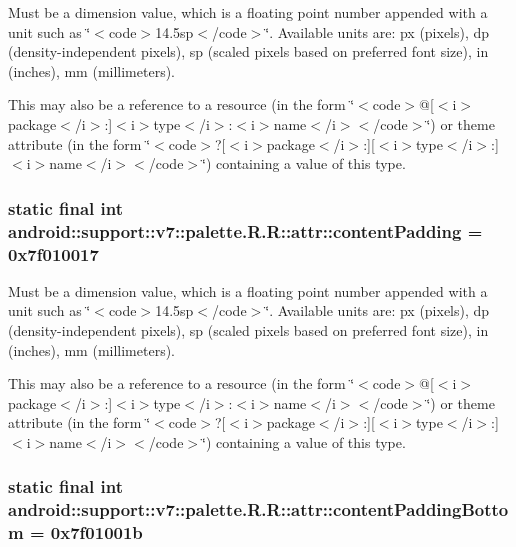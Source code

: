 Must be a dimension value, which is a floating point number appended with a unit such as \char`\"{}$<$code$>$14.5sp$<$/code$>$\char`\"{}. Available units are: px (pixels), dp (density-independent pixels), sp (scaled pixels based on preferred font size), in (inches), mm (millimeters). 

This may also be a reference to a resource (in the form \char`\"{}$<$code$>$@\mbox{[}$<$i$>$package$<$/i$>$:\mbox{]}$<$i$>$type$<$/i$>$:$<$i$>$name$<$/i$>$$<$/code$>$\char`\"{}) or theme attribute (in the form \char`\"{}$<$code$>$?\mbox{[}$<$i$>$package$<$/i$>$:\mbox{]}\mbox{[}$<$i$>$type$<$/i$>$:\mbox{]}$<$i$>$name$<$/i$>$$<$/code$>$\char`\"{}) containing a value of this type. \hypertarget{classandroid_1_1support_1_1v7_1_1palette_1_1_r_1_1attr_eb4ceadb1b14d3d6813615f538a4d65d}{
\subsubsection[{contentPadding}]{\setlength{\rightskip}{0pt plus 5cm}static final int android::support::v7::palette.R.R::attr::contentPadding = 0x7f010017}}
\label{classandroid_1_1support_1_1v7_1_1palette_1_1_r_1_1attr_eb4ceadb1b14d3d6813615f538a4d65d}


Must be a dimension value, which is a floating point number appended with a unit such as \char`\"{}$<$code$>$14.5sp$<$/code$>$\char`\"{}. Available units are: px (pixels), dp (density-independent pixels), sp (scaled pixels based on preferred font size), in (inches), mm (millimeters). 

This may also be a reference to a resource (in the form \char`\"{}$<$code$>$@\mbox{[}$<$i$>$package$<$/i$>$:\mbox{]}$<$i$>$type$<$/i$>$:$<$i$>$name$<$/i$>$$<$/code$>$\char`\"{}) or theme attribute (in the form \char`\"{}$<$code$>$?\mbox{[}$<$i$>$package$<$/i$>$:\mbox{]}\mbox{[}$<$i$>$type$<$/i$>$:\mbox{]}$<$i$>$name$<$/i$>$$<$/code$>$\char`\"{}) containing a value of this type. \hypertarget{classandroid_1_1support_1_1v7_1_1palette_1_1_r_1_1attr_0b15db9b22312d172b84d0f8f3e2fb5e}{
\subsubsection[{contentPaddingBottom}]{\setlength{\rightskip}{0pt plus 5cm}static final int android::support::v7::palette.R.R::attr::contentPaddingBottom = 0x7f01001b}}
\label{classandroid_1_1support_1_1v7_1_1palette_1_1_r_1_1attr_0b15db9b22312d172b84d0f8f3e2fb5e}


